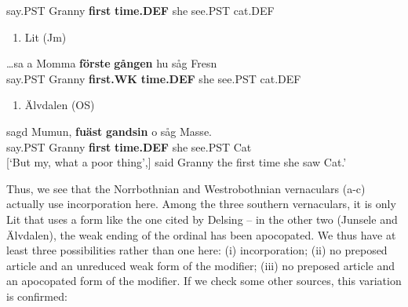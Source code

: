 say.PST  Granny  \textbf{first} \textbf{time.DEF} she  see.PST  cat.DEF\\ %


\begin{enumerate} %
\item 
Lit (Jm)

\end{enumerate} %
\ea\label{}
\gll …sa  a  Momma  \textbf{förste}\textbf{  gången} hu  såg  Fresn\\


say.PST    Granny  \textbf{first.WK} \textbf{time.DEF} she  see.PST  cat.DEF\\ %


\begin{enumerate} %
\item 
Älvdalen (OS)

\end{enumerate} %
\ea\label{}
\gll sagd  Mumun,  \textbf{fuäst}\textbf{  gandsin} o  såg  Masse.\\


say.PST  Granny  \textbf{first} \textbf{time.DEF} she  see.PST  Cat\\ %


[‘But my, what a poor thing’,] said Granny the first time she saw Cat.’
\z


Thus, we see that the Norrbothnian and Westrobothnian vernaculars (a-c) actually use incorporation here. Among the three southern vernaculars, it is only Lit that uses a form like the one cited by Delsing – in the other two (Junsele and Älvdalen), the weak ending of the ordinal has been apocopated. We thus have at least three possibilities rather than one here: (i) incorporation; (ii) no preposed article and an unreduced weak form of the modifier; (iii) no preposed article and an apocopated form of the modifier. If we check some other sources, this variation is confirmed:

